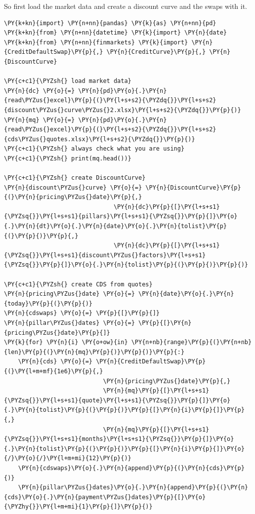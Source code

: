 So first load the market data and create a discount curve and the swaps with it.
\begin{tcolorbox}[breakable, size=fbox, boxrule=1pt, pad at break*=1mm,colback=cellbackground, colframe=cellborder]
\begin{Verbatim}[commandchars=\\\{\}]
\PY{k+kn}{import} \PY{n+nn}{pandas} \PY{k}{as} \PY{n+nn}{pd}
\PY{k+kn}{from} \PY{n+nn}{datetime} \PY{k}{import} \PY{n}{date}
\PY{k+kn}{from} \PY{n+nn}{finmarkets} \PY{k}{import} \PY{n}{CreditDefaultSwap}\PY{p}{,} \PY{n}{CreditCurve}\PY{p}{,} \PY{n}{DiscountCurve}
	
\PY{c+c1}{\PYZsh{} load market data}
\PY{n}{dc} \PY{o}{=} \PY{n}{pd}\PY{o}{.}\PY{n}{read\PYZus{}excel}\PY{p}{(}\PY{l+s+s2}{\PYZdq{}}\PY{l+s+s2}{discount\PYZus{}curve\PYZus{}2.xlsx}\PY{l+s+s2}{\PYZdq{}}\PY{p}{)}
\PY{n}{mq} \PY{o}{=} \PY{n}{pd}\PY{o}{.}\PY{n}{read\PYZus{}excel}\PY{p}{(}\PY{l+s+s2}{\PYZdq{}}\PY{l+s+s2}{cds\PYZus{}quotes.xlsx}\PY{l+s+s2}{\PYZdq{}}\PY{p}{)}
\PY{c+c1}{\PYZsh{} always check what you are using}
\PY{c+c1}{\PYZsh{} print(mq.head())}
	
\PY{c+c1}{\PYZsh{} create DiscountCurve}
\PY{n}{discount\PYZus{}curve} \PY{o}{=} \PY{n}{DiscountCurve}\PY{p}{(}\PY{n}{pricing\PYZus{}date}\PY{p}{,}
                               \PY{n}{dc}\PY{p}{[}\PY{l+s+s1}{\PYZsq{}}\PY{l+s+s1}{pillars}\PY{l+s+s1}{\PYZsq{}}\PY{p}{]}\PY{o}{.}\PY{n}{dt}\PY{o}{.}\PY{n}{date}\PY{o}{.}\PY{n}{tolist}\PY{p}{(}\PY{p}{)}\PY{p}{,}
                               \PY{n}{dc}\PY{p}{[}\PY{l+s+s1}{\PYZsq{}}\PY{l+s+s1}{discount\PYZus{}factors}\PY{l+s+s1}{\PYZsq{}}\PY{p}{]}\PY{o}{.}\PY{n}{tolist}\PY{p}{(}\PY{p}{)}\PY{p}{)}
	
\PY{c+c1}{\PYZsh{} create CDS from quotes}
\PY{n}{pricing\PYZus{}date} \PY{o}{=} \PY{n}{date}\PY{o}{.}\PY{n}{today}\PY{p}{(}\PY{p}{)}
\PY{n}{cdswaps} \PY{o}{=} \PY{p}{[}\PY{p}{]}
\PY{n}{pillar\PYZus{}dates} \PY{o}{=} \PY{p}{[}\PY{n}{pricing\PYZus{}date}\PY{p}{]}
\PY{k}{for} \PY{n}{i} \PY{o+ow}{in} \PY{n+nb}{range}\PY{p}{(}\PY{n+nb}{len}\PY{p}{(}\PY{n}{mq}\PY{p}{)}\PY{p}{)}\PY{p}{:}
    \PY{n}{cds} \PY{o}{=} \PY{n}{CreditDefaultSwap}\PY{p}{(}\PY{l+m+mf}{1e6}\PY{p}{,}
                            \PY{n}{pricing\PYZus{}date}\PY{p}{,}
                            \PY{n}{mq}\PY{p}{[}\PY{l+s+s1}{\PYZsq{}}\PY{l+s+s1}{quote}\PY{l+s+s1}{\PYZsq{}}\PY{p}{]}\PY{o}{.}\PY{n}{tolist}\PY{p}{(}\PY{p}{)}\PY{p}{[}\PY{n}{i}\PY{p}{]}\PY{p}{,}
                            \PY{n}{mq}\PY{p}{[}\PY{l+s+s1}{\PYZsq{}}\PY{l+s+s1}{months}\PY{l+s+s1}{\PYZsq{}}\PY{p}{]}\PY{o}{.}\PY{n}{tolist}\PY{p}{(}\PY{p}{)}\PY{p}{[}\PY{n}{i}\PY{p}{]}\PY{o}{/}\PY{o}{/}\PY{l+m+mi}{12}\PY{p}{)}
    \PY{n}{cdswaps}\PY{o}{.}\PY{n}{append}\PY{p}{(}\PY{n}{cds}\PY{p}{)}
    \PY{n}{pillar\PYZus{}dates}\PY{o}{.}\PY{n}{append}\PY{p}{(}\PY{n}{cds}\PY{o}{.}\PY{n}{payment\PYZus{}dates}\PY{p}{[}\PY{o}{\PYZhy{}}\PY{l+m+mi}{1}\PY{p}{]}\PY{p}{)}
\end{Verbatim}
\end{tcolorbox}

